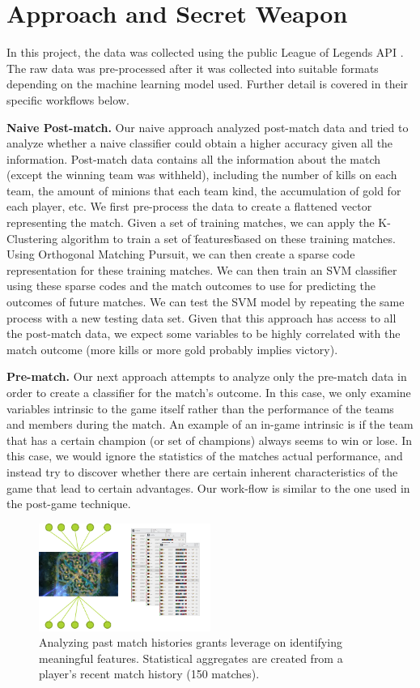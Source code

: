 \section{Approach and Secret Weapon  }

In this project, the data was collected using the public League of Legends API \cite{7_riot_games_2015}.  The raw data was pre-processed after it was collected into suitable formats depending on the machine learning model used.  Further detail is covered in their specific workflows below.

\textbf{Naive Post-match. } Our naive approach analyzed post-match data and tried to analyze whether a 
naive classifier could obtain a higher accuracy given all the information.  
Post-match data contains all the information about the match (except the winning 
team was withheld), including the number of kills on each team, the amount of minions 
that each team kind, the accumulation of gold for each player, etc.  We first pre-process 
the data to create a flattened vector representing the match.  
Given a set of training matches, we can apply the K-Clustering algorithm to train a 
set of \"features\" based on these training matches.  Using Orthogonal Matching Pursuit, we can then create a sparse code representation for these training matches.  
We can then train an SVM classifier using these sparse codes and the 
match outcomes to use for predicting the outcomes of future matches.  
We can test the SVM model by repeating the same process with a new testing data set.  Given that this approach has access to all the post-match data, 
we expect some variables to be highly correlated with the match 
outcome (more kills or more gold probably implies victory).

\textbf{Pre-match. } Our next approach attempts to analyze only the pre-match data in order to create 
a classifier for the match's outcome.  In this case, we only examine variables 
intrinsic to the game itself rather than the performance of the teams and members 
during the match.  An example of an in-game intrinsic is if the team that has a 
certain champion (or set of champions) always seems 
to win or lose.  In this case, we would ignore the statistics of the matches 
actual performance, and instead try to discover whether there are certain inherent 
characteristics of the game that lead to certain advantages.  Our work-flow is similar 
to the one used in the post-game technique.

\begin{figure}[t!]
  \centering
    \includegraphics[width=0.5\textwidth]{match+history}
  \caption{Analyzing past match histories grants leverage on identifying meaningful features.  Statistical aggregates are created from a player's recent match history (150 matches). }
  \label{fig:match-history}
\end{figure}

